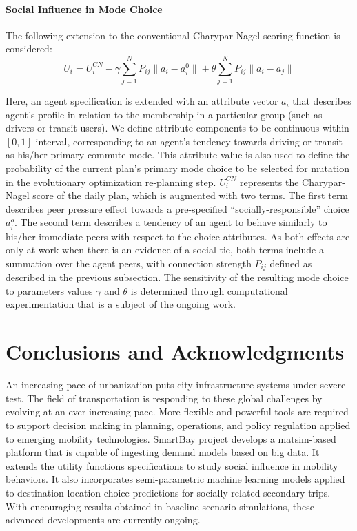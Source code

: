 \paragraph{Social Influence in Mode Choice} 
The following extension to the conventional Charypar-Nagel scoring function is considered:
\begin{equation*}
U_i=U_i^{CN} - \gamma \sum_{j=1}^N P_{ij}\|a_i - a_i^0\|+\theta \sum_{j=1}^N P_{ij}\|a_i - a_j\|
\end{equation*}

Here, an agent specification is extended with an attribute vector $a_i$ that describes agent's profile in relation to the membership in a particular group (such as drivers or transit users). We define attribute components to be continuous within $\left[0, 1\right]$ interval, corresponding to an agent's tendency towards driving or transit as his/her primary commute mode. This attribute value is also used to define the probability of the current plan's primary mode choice to be selected for mutation in the evolutionary optimization re-planning step. $U_i^{CN}$ represents the Charypar-Nagel score of the daily plan, which is augmented with two terms. The first term describes peer pressure effect towards a pre-specified ``socially-responsible'' choice $a_i^o$. The second term describes a tendency of an agent to behave similarly to his/her immediate peers with respect to the choice attributes. As both effects are only at work when there is an evidence of a social tie, both terms include a summation over the agent peers, with connection strength $P_{ij}$ defined as described in the previous subsection. The sensitivity of the resulting mode choice to parameters values $\gamma$ and $\theta$ is determined through computational experimentation that is a subject of the ongoing work.

\section{Conclusions and Acknowledgments}
An increasing pace of urbanization puts city infrastructure systems under severe test. The field of transportation is responding to these global challenges by evolving at an ever-increasing pace. More flexible and powerful tools are required to support decision making in planning, operations, and policy regulation applied to emerging mobility technologies. SmartBay project develops a \gls{matsim}-based platform that is capable of ingesting demand models based on big data. It extends the utility functions specifications to study social influence in mobility behaviors. It also incorporates semi-parametric machine learning models applied to destination location choice predictions for socially-related secondary trips. With encouraging results obtained in baseline scenario simulations, these advanced developments are currently ongoing. 

